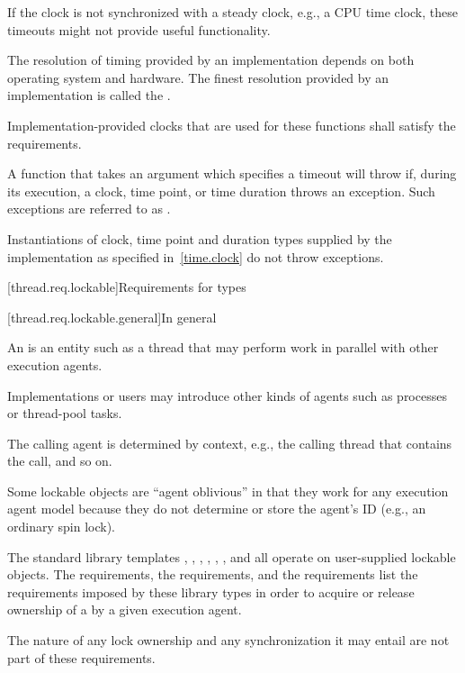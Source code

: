 \pnum
\begin{note} If the clock is not synchronized with a steady clock, e.g., a CPU time clock, these
timeouts might not provide useful functionality. \end{note}

\pnum
The resolution of timing provided by an implementation depends on both operating system
and hardware. The finest resolution provided by an implementation is called the
.

\pnum
Implementation-provided clocks that are used for these functions shall satisfy the
 requirements.

\pnum
A function that takes an argument which specifies a timeout will throw if,
during its execution, a clock, time point, or time duration throws an exception.
Such exceptions are referred to as .
\begin{note} Instantiations of clock, time point and duration types supplied by
the implementation as specified in~\ref{time.clock} do not throw exceptions.
\end{note}

[thread.req.lockable]{Requirements for  types}

[thread.req.lockable.general]{In general}

\pnum
An  is an entity such as a thread that may perform work in parallel with
other execution agents. \begin{note} Implementations or users may introduce other kinds of
agents such as processes or thread-pool tasks. \end{note} The calling agent is determined by
context, e.g., the calling thread that contains the call, and so on.

\pnum
\begin{note} Some lockable objects are ``agent oblivious'' in that they work for any
execution agent model because they do not determine or store the agent's ID (e.g., an
ordinary spin lock). \end{note}

\pnum
The standard library templates ,
,
,
, ,
, and
 all operate on user-supplied
lockable objects. The  requirements, the  requirements,
and the  requirements list the requirements imposed by these library types
in order to acquire or release ownership of a  by a given execution agent.
\begin{note} The nature of any lock ownership and any synchronization it may entail are not part
of these requirements. \end{note}

